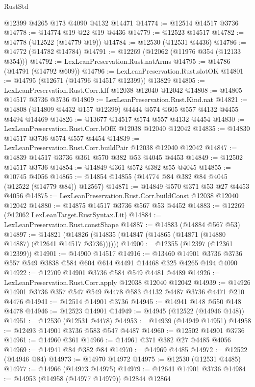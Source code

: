 \begin{lexlean}{RustStd}
\begin{coremodule}
    @12399
    @4265
    @173
    @4090
    @4132
    @14471
@14774 := @12514 @14517 @3736
@14778 := @14774 @19 @22 @19 @4436
@14779 := @12523 @14517
@14782 := @14778 (@12522 (@14779 @19))
@14784 := @12530 (@12531 @4436)
@14786 := @14772 (@14782 @14784)
@14791 := @12269 (@12062 (@11976 @354 (@12133 @354)))
@14792 := LexLeanPreservation.Rust.natArms
@14795 := @14786 (@14791 (@14792 @609))
@14796 := LexLeanPreservation.Rust.slotOK
@14801 := @14795 (@12671 (@14796 @14517 @12399)) @13829
@14805 := LexLeanPreservation.Rust.Corr.kIf @12038 @12040 @12042
@14808 := @14805 @14517 @3736 @3736
@14809 := LexLeanPreservation.Rust.Kind.nat
@14821 := @14808 (@14809 @4432 @157 @12399) @4444 @574 @605 @557 @4132 @4455 @4494 @14469
@14826 := @13677 @14517 @574 @557 @4132 @4454
@14830 := LexLeanPreservation.Rust.Corr.bOfE @12038 @12040 @12042
@14835 := @14830 @14517 @3736 @574 @557 @4454
@14839 := LexLeanPreservation.Rust.Corr.buildPair @12038 @12040 @12042
@14847 := @14839 @14517 @3736 @361 @570 @382 @53 @4045 @4453
@14849 := @12502 @14517 @3736
@14854 := @14849 @361 @572 @382 @55 @4045
@14855 := @10745 @4056
@14865 := @14854 @14855 (@14774 @84 @382 @84 @4045 (@12522 (@14779 @84)) @12567)
@14871 := @14849 @570 @371 @53 @27 @4453 @4056
@14875 := LexLeanPreservation.Rust.Corr.buildConst @12038 @12040 @12042
@14880 := @14875 @14517 @3736 @567 @53 @4452
@14883 := @12269 (@12062 LexLeanTarget.RustSyntax.Lit)
@14884 := LexLeanPreservation.Rust.constShape
@14887 := @14883 (@14884 @567 @53)
@14897 := @14821 (@14826 (@14835 (@14847 (@14865 (@14871 (@14880 @14887) (@12641 @14517 @3736))))))
@14900 := @12355 (@12397 (@12361 @12399))
@14901 := @14900 @14517
@14916 := @13460
    @14901
    @3736
    @3736
    @557
    @549
    @3838
    @584
    @604
    @614
    @4491
    @14468
    @325
    @4265
    @194
    @4090
@14922 := @12709 @14901 @3736 @584 @549 @4481 @4489
@14926 := LexLeanPreservation.Rust.Corr.apply @12038 @12040 @12042
@14939 := @14926 @14901 @3736 @357 @547 @549 @4478 @583 @4132 @4487 @3736 @4471 @210 @4476
@14941 := @12514 @14901 @3736
@14945 := @14941 @148 @550 @148 @4478
@14946 := @12523 @14901
@14949 := @14945 (@12522 (@14946 @148))
@14951 := @12530 (@12531 @4478)
@14953 := @14939 (@14949 @14951)
@14958 := @12493 @14901 @3736 @583 @547 @4487
@14960 := @12502 @14901 @3736
@14961 := @14960 @361
@14966 := @14961 @371 @382 @27 @4485 @4056
@14969 := @14941 @84 @382 @84
@14970 := @14969 @4485
@14972 := @12522 (@14946 @84)
@14973 := @14970 @14972
@14975 := @12530 (@12531 @4485)
@14977 := @14966 (@14973 @14975)
@14979 := @12641 @14901 @3736
@14984 := @14953 (@14958 (@14977 @14979)) @12844 @12864

\end{coremodule}
\end{lexlean}
